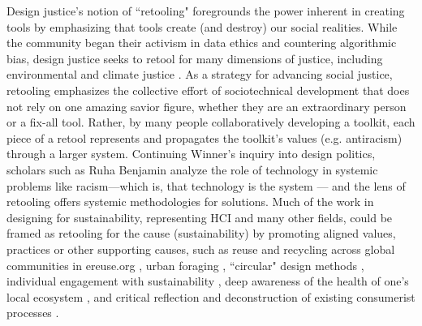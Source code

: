 Design justice's notion of ``retooling" foregrounds the power inherent in creating tools by emphasizing that tools create (and destroy) our social realities. While the community began their activism in data ethics and countering algorithmic bias, design justice seeks to retool for many dimensions of justice, including environmental and climate justice \todo{[153]}. As a strategy for advancing social justice, retooling emphasizes the collective effort of sociotechnical development that does not rely on one amazing savior figure, whether they are an extraordinary person or a fix-all tool. Rather, by many people collaboratively developing a toolkit, each piece of a retool represents and propagates the toolkit's values (e.g. antiracism) through a larger system. Continuing Winner's inquiry into design politics, scholars such as Ruha Benjamin analyze the role of technology in systemic problems like racism---which is, that technology is the system \cite{benjamin_race_2019} --- and the lens of retooling offers systemic methodologies for solutions. Much of the work in designing for sustainability, representing HCI and many other fields, could be framed as retooling for the cause (sustainability) by promoting aligned values, practices or other supporting causes, such as reuse and recycling across global communities in ereuse.org \cite{franquesa_circular_2016}, urban foraging \cite{disalvo_fruit_2017}, ``circular" design methods \todo{[141]}, individual engagement with sustainability \todo{[39,41]}, deep awareness of the health of one's local ecosystem \todo{[8,73,78,149]}, and critical reflection and deconstruction of existing consumerist processes \todo{[19,101,107,117]}.

